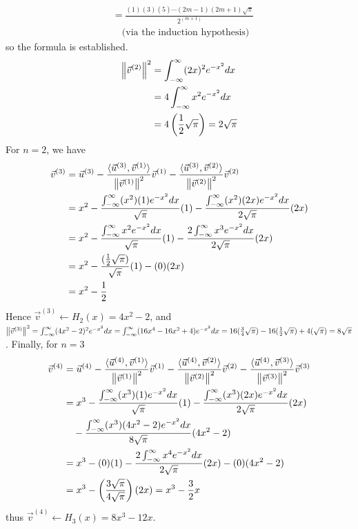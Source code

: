 \begin{solution}
{\begin{align*}
&= \frac{(1)(3)(5)\cdots(2m-1)(2m+1)\sqrt{\pi}}{2^{(m+1)}} \\
&\quad \text{(via the induction hypothesis)}
\end{align*}
so the formula is established.} 
\begin{align*}
\norm{\vec{v}^{(2)}}^2 &= \int_{-\infty}^{\infty} (2x)^2 e^{-x^2} dx \\
&= 4\int_{-\infty}^{\infty} x^2 e^{-x^2} dx \\
&= 4\left(\frac{1}{2}\sqrt{\pi}\right) = 2\sqrt{\pi}
\end{align*}
For $n=2$, we have
\begin{align*}
\vec{v}^{(3)} &= \vec{u}^{(3)} - \frac{\langle\vec{u}^{(3)}, \vec{v}^{(1)}\rangle}{\norm{\vec{v}^{(1)}}^2} \vec{v}^{(1)} - \frac{\langle\vec{u}^{(3)}, \vec{v}^{(2)}\rangle}{\norm{\vec{v}^{(2)}}^2} \vec{v}^{(2)} \\
&= x^2 - \frac{\int_{-\infty}^{\infty} (x^2)(1) e^{-x^2} dx}{\sqrt{\pi}} (1) - \frac{\int_{-\infty}^{\infty} (x^2)(2x) e^{-x^2} dx}{2\sqrt{\pi}} (2x) \\
&= x^2 - \frac{\int_{-\infty}^{\infty} x^2 e^{-x^2} dx}{\sqrt{\pi}} (1) - \frac{2 \int_{-\infty}^{\infty} x^3 e^{-x^2} dx}{2\sqrt{\pi}} (2x) \\
&= x^2 - \frac{(\frac{1}{2}\sqrt{\pi})}{\sqrt{\pi}} (1) - (0) (2x) \\
&= x^2 - \frac{1}{2}
\end{align*}
Hence $\vec{v}^{(3)} \leftarrow H_2(x) = 4x^2 - 2$, and $\norm{\vec{v}^{(3)}}^2 = \int_{-\infty}^{\infty} (4x^2 - 2)^2 e^{-x^2} dx = \int_{-\infty}^{\infty} (16 x^4 - 16 x^2 + 4)e^{-x^2} dx = 16(\frac{3}{4}\sqrt{\pi}) - 16(\frac{1}{2}\sqrt{\pi}) + 4(\sqrt{\pi}) = 8\sqrt{\pi}$. Finally, for $n=3$
\begin{align*}
\vec{v}^{(4)} &= \vec{u}^{(4)} - \frac{\langle\vec{u}^{(4)}, \vec{v}^{(1)}\rangle}{\norm{\vec{v}^{(1)}}^2} \vec{v}^{(1)} - \frac{\langle\vec{u}^{(4)}, \vec{v}^{(2)}\rangle}{\norm{\vec{v}^{(2)}}^2} \vec{v}^{(2)} - \frac{\langle\vec{u}^{(4)}, \vec{v}^{(3)}\rangle}{\norm{\vec{v}^{(3)}}^2} \vec{v}^{(3)}\\  
&= x^3 - \frac{\int_{-\infty}^{\infty} (x^3)(1) e^{-x^2} dx}{\sqrt{\pi}} (1) - \frac{\int_{-\infty}^{\infty} (x^3)(2x) e^{-x^2} dx}{2\sqrt{\pi}} (2x) \\
&\quad - \frac{\int_{-\infty}^{\infty} (x^3)(4x^2 - 2) e^{-x^2} dx}{8\sqrt{\pi}} (4x^2 - 2) \\
&= x^3 - (0)(1) - \frac{2\int_{-\infty}^{\infty} x^4 e^{-x^2} dx}{2\sqrt{\pi}} (2x) - (0)(4x^2 - 2) \\
&= x^3 - \left(\frac{3\sqrt{\pi}}{4\sqrt{\pi}}\right)(2x) = x^3 - \frac{3}{2}x
\end{align*}
thus $\vec{v}^{(4)} \leftarrow H_3(x) = 8x^3 - 12x$.
\end{solution}

